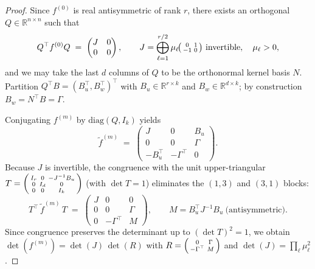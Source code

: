 \documentclass[10pt,a4paper]{amsart}
\begin{document}
\begin{proof}
	Since $f^{(0)}$ is real antisymmetric of rank $r$, there exists an orthogonal $Q \in \mathbb{R}^{n\times n}$ such that
	\[
	Q^{\top} f^{(0)} Q \;=\; \begin{pmatrix} J & 0 \\ 0 & 0 \end{pmatrix}, \qquad J = \bigoplus_{\ell=1}^{r/2}\mu_\ell\!\begin{psmallmatrix}0 & 1 \\ -1 & 0\end{psmallmatrix}\ \text{invertible},\quad \mu_\ell>0,
	\]
	and we may take the last $d$ columns of $Q$ to be the orthonormal kernel basis $N$. Partition $Q^{\top} B = (B_u^{\top}, B_w^{\top})^{\top}$ with $B_u \in \mathbb{R}^{r\times k}$ and $B_w \in \mathbb{R}^{d\times k}$; by construction $B_w = N^{\top}B = \Gamma$.
	
	Conjugating $f^{(m)}$ by $\mathrm{diag}(Q, I_k)$ yields
	\[
	\widetilde{f}^{(m)} \;=\; \begin{pmatrix} J & 0 & B_u \\ 0 & 0 & \Gamma \\ -B_u^{\top} & -\Gamma^{\top} & 0 \end{pmatrix}.
	\]
	Because $J$ is invertible, the congruence with the unit upper-triangular
	$T = \begin{psmallmatrix} I_r & 0 & -J^{-1}B_u \\ 0 & I_{d} & 0 \\ 0 & 0 & I_k \end{psmallmatrix}$
	(with $\det T = 1$) eliminates the $(1,3)$ and $(3,1)$ blocks:
	\[
	T^{\top}\, \widetilde{f}^{(m)}\, T \;=\; \begin{pmatrix} J & 0 & 0 \\ 0 & 0 & \Gamma \\ 0 & -\Gamma^{\top} & M \end{pmatrix},
	\qquad M = B_u^{\top} J^{-1} B_u\ \text{(antisymmetric)}.
	\]
	Since congruence preserves the determinant up to $(\det T)^2 = 1$, we obtain $\det(f^{(m)}) = \det(J)\,\det(R)$ with $R = \begin{psmallmatrix} 0 & \Gamma \\ -\Gamma^{\top} & M \end{psmallmatrix}$ and $\det(J) = \prod_{\ell}\mu_\ell^{2}$.
	

\end{proof}
\end{document}
